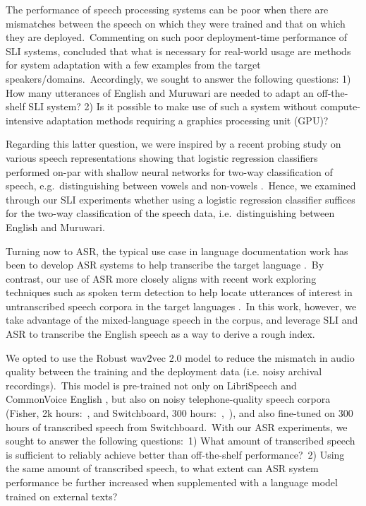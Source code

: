 \documentclass[main.tex]{subfiles}
\begin{document}
The performance of speech processing systems can be poor when there are mismatches between the speech on which they were trained and that on which they are deployed.~Commenting on such poor deployment-time performance of SLI systems, \textcite{salesky2021sigtyp} concluded that what is necessary for real-world usage are methods for system adaptation with a few examples from the target speakers/domains.~Accordingly, we sought to answer the following questions: 1) How many utterances of English and Muruwari are needed to adapt an off-the-shelf SLI system?
2) Is it possible to make use of such a system without compute-intensive adaptation methods requiring a graphics processing unit (GPU)?

Regarding this latter question, we were inspired by a recent probing study on various speech representations showing that logistic regression classifiers performed on-par with shallow neural networks for two-way classification of speech, e.g.~distinguishing between vowels and non-vowels \parencite{ma2021probing}.~Hence, we examined through our SLI experiments whether using a logistic regression classifier suffices for the two-way classification of the speech data, i.e.~distinguishing between English and Muruwari.

Turning now to ASR, the typical use case in language documentation work has been to develop ASR systems to help transcribe the target language \parencite[e.g.][]{adams2018evaluating,shi2021leveraging,prud2021automatic}.~By contrast, our use of ASR more closely aligns with recent work exploring techniques such as spoken term detection to help locate utterances of interest in untranscribed speech corpora in the target languages \parencite{le-ferrand-etal-2020-enabling,le2021phone,san2021leveraging}.~In this work, however, we take advantage of the mixed-language speech in the corpus, and leverage SLI and ASR to transcribe the English speech as a way to derive a rough index.

We opted to use the Robust wav2vec 2.0 model \parencite{hsu2021robust} to reduce the mismatch in audio quality between the training and the deployment data (i.e. noisy archival recordings).~This model is pre-trained not only on \mbox{LibriSpeech} \parencite[960 hours:][]{panayotov2015librispeech} and CommonVoice English \parencite[700 hours:][]{ardila2019common}, but also on noisy telephone-quality speech corpora (Fisher, 2k hours:~\citeauthor{cieri2004fisher}, \citeyear{cieri2004fisher} and Switchboard, 300 hours:~\citeauthor{godfrey1992switchboard},~\citeyear{godfrey1992switchboard}), and also fine-tuned on 300 hours of transcribed speech from Switchboard.~With our ASR experiments, we sought to answer the following questions:~1) What amount of transcribed speech is sufficient to reliably achieve better than off-the-shelf performance?~2) Using the same amount of transcribed speech, to what extent can ASR system performance be further increased when supplemented with a language model trained on external texts?
\end{document}
